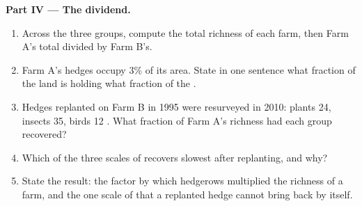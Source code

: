 \begin{problem}
\medskip
\noindent\textbf{Part IV --- The dividend.}
\begin{enumerate}[resume]
  \item Across the three groups, compute the total  richness
        of each farm, then Farm A's total divided by Farm B's.
  \item Farm A's hedges occupy 3\% of its area. State in one sentence
        what fraction of the land is holding what fraction of the
        .
  \item Hedges replanted on Farm B in 1995 were resurveyed in 2010:
        plants 24, insects 35, birds 12 . What fraction of Farm
        A's richness had each group recovered?
  \item Which of the three scales of  recovers slowest
        after replanting, and why?
  \item State the result: the factor by which hedgerows multiplied the
         richness of a farm, and the one scale of 
        that a replanted hedge cannot bring back by itself.
\end{enumerate}
\end{problem}
